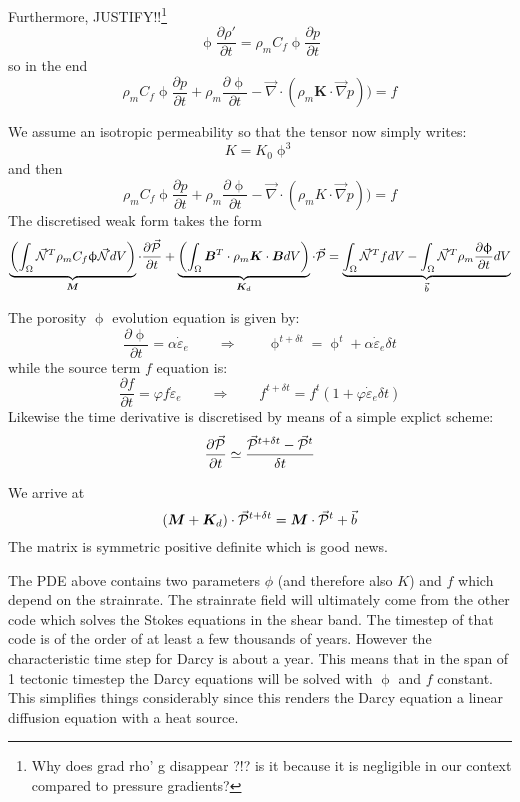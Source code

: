 Furthermore, JUSTIFY!!\footnote{Why does grad rho' g disappear ?!? is it because 
it is negligible in our context compared to pressure gradients?}
\[
\upphi \frac{\partial \rho'}{\partial t}
=
\rho_m C_f  \upphi \frac{\partial p}{\partial t}
\]
so in the end 
\begin{equation}
\rho_m C_f  \upphi \frac{\partial p}{\partial t}
+ \rho_m \frac{\partial \upphi}{\partial t} 
- \vec\nabla \cdot (\rho_m {\bm K} \cdot \vec{\nabla} p ) ) = f
\end{equation}

We assume an isotropic permeability so that the tensor now simply writes:
\[
K = K_0 \upphi^3
\]
and then 
\begin{equation}
\rho_m C_f  \upphi \frac{\partial p}{\partial t}
+ \rho_m \frac{\partial \upphi}{\partial t} 
- \vec\nabla \cdot (\rho_m K \cdot \vec{\nabla} p ) ) = f
\end{equation}
The discretised weak form takes the form
\[
\underbrace{
\left( \int_\Omega \vec{{\mathcal{N}}}^T \rho_m C_f \upphi \vec{{\mathcal{N}}} dV  \right)
}_{\bm M}
 \cdot \frac{\partial \vec{\cal P}}{\partial t}
+
\underbrace{
\left( \int_\Omega {\bm B}^T \cdot \rho_m {\bm K} \cdot {\bm B} dV \right)
}_{{\bm K}_d}
 \cdot \vec{\cal P}
=
\underbrace{
\int_\Omega \vec{{\mathcal{N}}}^T f dV 
-
\int_\Omega \vec{{\mathcal{N}}}^T   \rho_m \frac{\partial \upphi}{\partial t} dV
}_{\vec{b}}
\]


The porosity $\upphi$ evolution equation is given by:
\[
\frac{\partial \upphi}{\partial t} = \alpha \dot{\varepsilon}_e
\qquad
\Rightarrow
\qquad
\upphi^{t+\delta t} = \upphi^t + \alpha \dot{\varepsilon}_e \delta t
\]
while the source term $f$ equation is:
\[
\frac{\partial f}{\partial t} = \varphi f \dot{\varepsilon}_e
\qquad
\Rightarrow
\qquad
f^{t+\delta t} = f^t (1 + \varphi  \dot{\varepsilon}_e \delta t)
\]
Likewise the time derivative is discretised by means of a simple explict 
scheme:
\[
\frac{\partial \vec{\cal P}}{\partial t} \simeq
\frac{ \vec{\cal P}^{t+\delta t} - \vec{\cal P}^t  }{\delta t}
\]

We arrive at 
\[
( {\bm M} + {\bm K}_d) \cdot \vec{\cal P}^{t+\delta t} = {\bm M} \cdot \vec{\cal P}^t  + \vec{b}
\]
The matrix is symmetric positive definite which is good news.

The PDE above contains two parameters $\phi$ (and therefore also $K$) and $f$
which depend on the strainrate. 
The strainrate field will ultimately come from the other code which 
solves the Stokes equations in the shear band. The timestep of that code 
is of the order of at least a few thousands of years. However the characteristic time step
for Darcy is about a year. This means that in the span of 1 tectonic timestep
the Darcy equations will be solved with $\upphi$ and $f$ constant. 
This simplifies things considerably since this renders the Darcy equation a linear 
diffusion equation with a heat source. 

